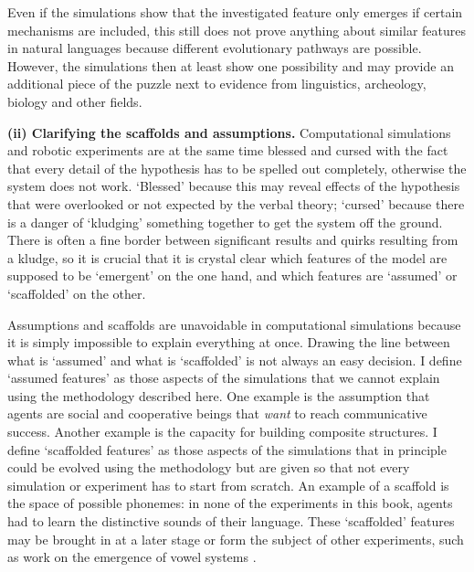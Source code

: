 Even if the simulations show that the investigated feature only emerges if certain mechanisms are included, this still does not prove anything about similar features in natural languages because different evolutionary pathways are possible. However, the simulations then at least show one possibility and may provide an additional piece of the puzzle next to evidence from linguistics, archeology, biology and other fields.

{\bfseries (ii) Clarifying the scaffolds and assumptions.} Computational simulations and robotic experiments are at the same time blessed and cursed with the fact that every detail of the hypothesis has to be spelled out completely, otherwise the system does not work. `Blessed' because this may reveal effects of the hypothesis that were overlooked or not expected by the verbal theory; `cursed' because there is a danger of `kludging' something together to get the system off the ground. There is often a fine border between significant results and quirks resulting from a kludge, so it is crucial that it is crystal clear which features of the model are supposed to be `emergent' on the one hand, and which features are `assumed' or `scaffolded' on the other.

Assumptions and scaffolds are unavoidable in computational simulations because it is simply impossible to explain everything at once. Drawing the line between what is `assumed' and what is `scaffolded' is not always an easy decision. I define `assumed features' as those aspects of the simulations that we cannot explain using the methodology described here. One example is the assumption that agents are social and cooperative beings that {\em want} to reach communicative success. Another example is the capacity for building composite structures. I define `scaffolded features' as those aspects of the simulations that in principle could be evolved using the methodology but are given so that not every simulation or experiment has to start from scratch. An example of a scaffold is the space of possible phonemes: in none of the experiments in this book, agents had to learn the distinctive sounds of their language. These `scaffolded' features may be brought in at a later stage or form the subject of other experiments, such as work on the emergence of vowel systems \citep{deboer00self, oudeyer05self-organization}.

